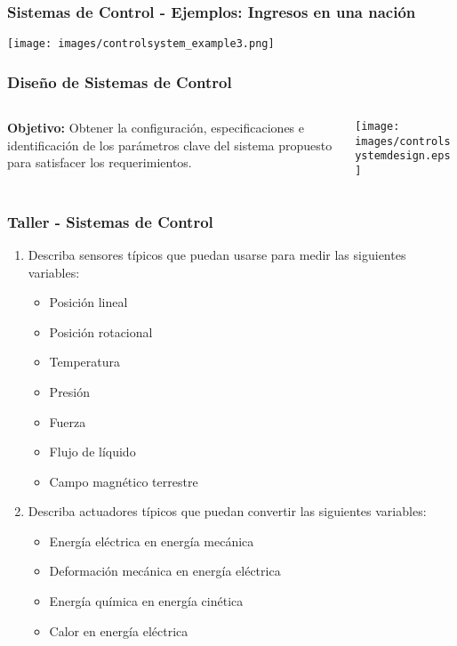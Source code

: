 \documentclass[aspectratio=169]{beamer}
\theoremstyle{definition}
\theoremstyle{plain}
\theoremstyle{remark}
\newcounter{saveenumi}
\newcommand{\seti}{\setcounter{saveenumi}{\value{enumi}}}
\begin{document}
\begin{frame}[c]\frametitle{Sistemas de Control - Ejemplos: Ingresos en una nación}
  \begin{center}
    \texttt{[image: images/controlsystem\_example3.png]}
  \end{center}
\end{frame}

\begin{frame}[c]\frametitle{Diseño de Sistemas de Control}
  \begin{columns}
    \begin{column}{0.4\textwidth}
       \textbf{Objetivo:} Obtener la configuración, especificaciones e identificación de los parámetros clave del sistema propuesto para satisfacer los requerimientos.
    \end{column}
    \begin{column}{0.6\textwidth}
      \begin{center}
        \texttt{[image: images/controlsystemdesign.eps]}
      \end{center}
    \end{column}
  \end{columns}
\end{frame}

\begin{frame}[c]\frametitle{Taller - Sistemas de Control}
\begin{enumerate}
  \item Describa sensores típicos que puedan usarse para medir las siguientes variables:
  \begin{itemize}
    \item Posición lineal
    \item Posición rotacional
    \item Temperatura
    \item Presión
    \item Fuerza
    \item Flujo de líquido
    \item Campo magnético terrestre
  \end{itemize}
  \item Describa actuadores típicos que puedan convertir las siguientes variables:
  \begin{itemize}
    \item Energía eléctrica en energía mecánica
    \item Deformación mecánica en energía eléctrica
    \item Energía química en energía cinética
    \item Calor en energía eléctrica
  \end{itemize}
  \seti
\end{enumerate}
\end{frame}
\end{document}
